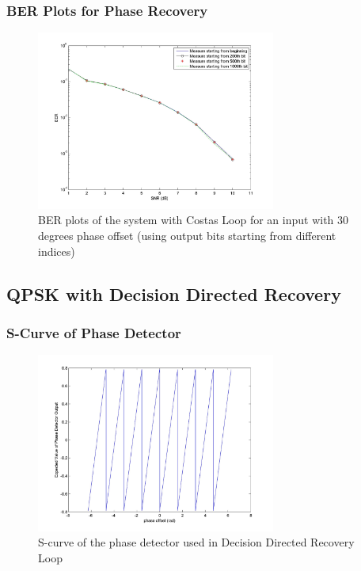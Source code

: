 \documentclass[]{article}
\begin{document}
\subsubsection{BER Plots for Phase Recovery}
\begin{figure}[H]
\centering
\hspace*{-2cm}\includegraphics[width=0.7\textwidth]{qpBERpo_costas1.jpg}
\caption{BER plots of the system with Costas Loop for an input with 30 degrees phase offset (using output bits starting from different indices)}
\end{figure}

\subsection{QPSK with Decision Directed Recovery}

\subsubsection{S-Curve of Phase Detector}
\begin{figure}[H]
\centering
\hspace*{-2cm}\includegraphics[width=0.7\textwidth]{qpScurvepo_ddr.jpg}
\caption{S-curve of the phase detector used in Decision Directed Recovery Loop}
\end{figure}
\end{document}
